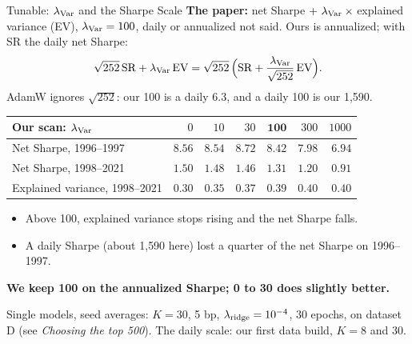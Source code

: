 \documentclass[11pt]{beamer}
\newcommand{\src}[1]{%
  \par\vfill
  {\fontsize{6.4}{7.6}\selectfont\color{Muted}#1\par}
}
\newcommand{\claim}[1]{%
  \par{\color{SBred}\bfseries #1\par}
}
\renewcommand{\src}[1]{%
  \par\vfill
  {\fontsize{6.4}{7.6}\selectfont#1\par}
}
\begin{document}
\begin{frame}{Tunable: $\lambda_{\rm Var}$ and the Sharpe Scale}
\small
\setlength{\abovedisplayskip}{3pt}
\setlength{\belowdisplayskip}{3pt}
\textbf{The paper:} net Sharpe $+\ \lambda_{\rm Var}\times{}$explained variance (EV), $\lambda_{\rm Var}=100$,
daily or annualized not said. Ours is annualized; with SR the daily net Sharpe:
\[
\sqrt{252}\,\mathrm{SR}+\lambda_{\rm Var}\,\mathrm{EV}
=\sqrt{252}\,\Big(\mathrm{SR}+\frac{\lambda_{\rm Var}}{\sqrt{252}}\,\mathrm{EV}\Big).
\]
AdamW ignores $\sqrt{252}$: our 100 is a daily 6.3, and a daily 100 is our 1{,}590.
\begin{center}
\begin{tabular}{@{}lrrrrrr@{}}
\toprule
Our scan: $\lambda_{\rm Var}$ & $0$ & $10$ & $30$ & $\mathbf{100}$ & $300$ & $1000$\\
\midrule
Net Sharpe, 1996--1997 & $8.56$ & $8.54$ & $8.72$ & $8.42$ & $7.98$ & $6.94$\\
Net Sharpe, 1998--2021 & $1.50$ & $1.48$ & $1.46$ & $1.31$ & $1.20$ & $0.91$\\
Explained variance, 1998--2021 & $0.30$ & $0.35$ & $0.37$ & $0.39$ & $0.40$ & $0.40$\\
\bottomrule
\end{tabular}
\end{center}
\begin{itemize}
\item Above 100, explained variance stops rising and the net Sharpe falls.
\item A daily Sharpe (about 1{,}590 here) lost a quarter of the net Sharpe on 1996--1997.
\end{itemize}
\claim{We keep 100 on the annualized Sharpe; 0 to 30 does slightly better.}
\src{Single models, seed averages: $K=30$, 5 bp, $\lambda_{\rm ridge}=10^{-4}$, 30 epochs, on dataset D (see \emph{Choosing the top 500}). The daily scale: our first data build, $K=8$ and $30$.}
\end{frame}
\end{document}
